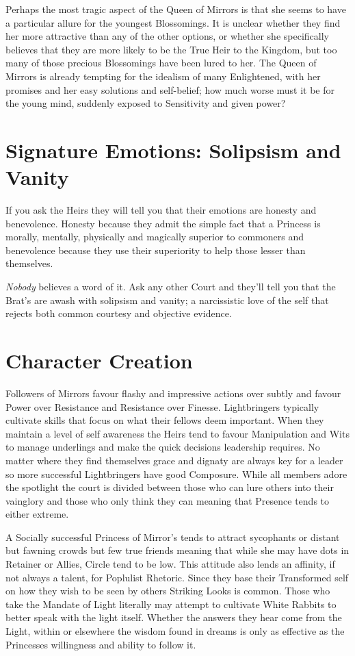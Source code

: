 Perhaps the most tragic aspect of the Queen of Mirrors is that she seems to have a particular allure for the youngest Blossomings. It is unclear whether they find her more attractive than any of the other options, or whether she specifically believes that they are more likely to be the True Heir to the Kingdom, but too many of those precious Blossomings have been lured to her. The Queen of Mirrors is already tempting for the idealism of many Enlightened, with her promises and her easy solutions and self-belief; how much worse must it be for the young mind, suddenly exposed to Sensitivity and given power? 

\section*{Signature Emotions: Solipsism and Vanity}

If you ask the Heirs they will tell you that their emotions are honesty and benevolence. Honesty because they admit the simple fact that a Princess is morally, mentally, physically and magically superior to commoners and benevolence because they use their superiority to help those lesser than themselves. 

\textit{Nobody} believes a word of it. Ask any other Court and they'll tell you that the Brat's are awash with solipsism and vanity; a narcissistic love of the self that rejects both common courtesy and objective evidence. 

\section*{Character Creation}
Followers of Mirrors favour flashy and impressive actions over subtly and favour Power over Resistance and Resistance over Finesse. Lightbringers typically cultivate skills that focus on what their fellows deem important. When they maintain a level of self awareness the Heirs tend to favour Manipulation and Wits to manage underlings and make the quick decisions leadership requires. No matter where they find themselves grace and dignaty are always key for a leader so more successful Lightbringers have good Composure. While all members adore the spotlight the court is divided between those who can lure others into their vainglory and those who only think they can meaning that Presence tends to either extreme.

A Socially successful Princess of Mirror's tends to attract sycophants or distant but fawning crowds but few true friends meaning that while she may have dots in Retainer or Allies, Circle tend to be low. This attitude also lends an affinity, if not always a talent, for Poplulist Rhetoric. Since they base their Transformed self on how they wish to be seen by others Striking Looks is common. Those who take the Mandate of Light literally may attempt to cultivate White Rabbits to better speak with the light itself. Whether the answers they hear come from the Light, within or elsewhere the wisdom found in dreams is only as effective as the Princesses willingness and ability to follow it. 

